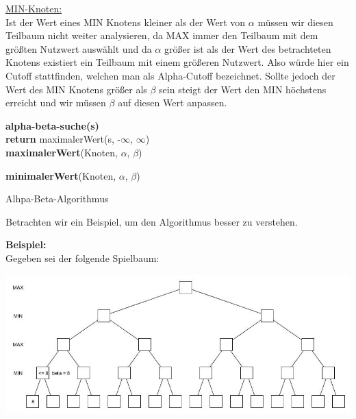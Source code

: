  \underline{MIN-Knoten:}\\
 Ist der Wert eines MIN Knotens kleiner als der Wert von $\alpha$ müssen wir diesen Teilbaum nicht weiter analysieren, da MAX immer den Teilbaum mit dem größten Nutzwert auswählt und da $\alpha$ größer ist als der Wert des betrachteten Knotens existiert ein Teilbaum mit einem größeren Nutzwert. Also würde hier ein Cutoff stattfinden, welchen man als Alpha-Cutoff bezeichnet. Sollte jedoch der Wert des MIN Knotens größer als $\beta$ sein steigt der Wert den MIN höchstens erreicht und wir müssen $\beta$ auf diesen Wert anpassen.


 \begin{algorithm}
 	\textbf{alpha-beta-suche(s)}\\

 	\textbf{return} maximalerWert(s, -$\infty$, $\infty$)\\

 	\textbf{maximalerWert}(Knoten, $\alpha$, $\beta$)\\


	\textbf{minimalerWert}(Knoten, $\alpha$, $\beta$)\\

 	\caption{Alhpa-Beta-Algorithmus}
\end{algorithm}

Betrachten wir ein Beispiel, um den Algorithmus besser zu verstehen.

\textbf{Beispiel:}\\

Gegeben sei der folgende Spielbaum:
\begin{center}
	\includegraphics[width = 12 cm]{chapters/minimax/jpg/Alpha-beta1.jpg}
\end{center}

